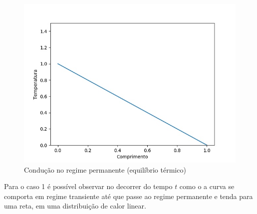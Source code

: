 \documentclass[journal]{IEEEtran}
\begin{document}
		\begin{figure}[H]
			\begin{center}
				\includegraphics[scale=0.3]{res1-3}
				\caption{Condução no regime permanente (equilíbrio térmico)}
			\end{center}
		\end{figure}
		\par Para o caso 1 é possível observar no decorrer do tempo $t$ como o a curva se comporta em regime transiente até que passe ao regime permanente e tenda para uma reta, em uma distribuição de calor linear.
\end{document}
